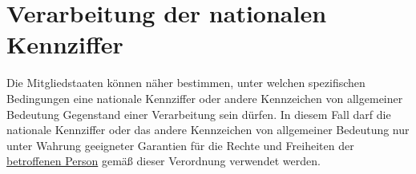 \chapter{Verarbeitung der nationalen Kennziffer}
\label{ch:87}


Die Mitgliedstaaten können näher bestimmen, unter welchen spezifischen Bedingungen eine nationale Kennziffer oder andere
Kennzeichen von allgemeiner Bedeutung Gegenstand einer Verarbeitung sein dürfen. In diesem Fall darf die nationale
Kennziffer oder das andere Kennzeichen von allgemeiner Bedeutung nur unter Wahrung geeigneter Garantien für die Rechte
und Freiheiten der \hyperref[itm:04-1]{betroffenen Person} gemäß dieser Verordnung verwendet werden.


